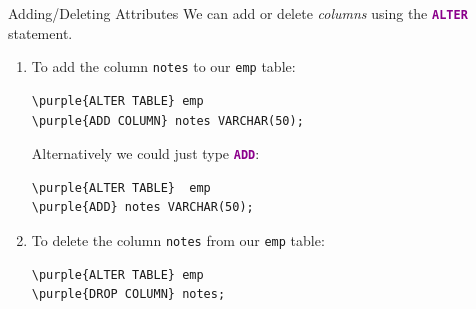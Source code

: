 \documentclass[xcolor=svgnames]{beamer}
\newcommand{\purple}[1]{{\textcolor{DarkMagenta}{#1}}}
\newcommand{\command}[1]{\texttt{\textbf{\textcolor{DarkMagenta}{#1}}}}
\theoremstyle{example}
\begin{document}



\begin{frame}[fragile]{Adding/Deleting Attributes}
We can add or delete \textit{columns}  using the \command{ALTER} statement.  
\vfill
\begin{enumerate}
\item To add the column {\tt notes} to our {\tt emp} table:\\
\begin{Verbatim}[commandchars=\\\{\}, xleftmargin=0.1in, frame=single]
\purple{ALTER TABLE} emp 
\purple{ADD COLUMN} notes VARCHAR(50);
\end{Verbatim}
\vspace{1em}

Alternatively we could just type \command{ADD}:
\begin{Verbatim}[commandchars=\\\{\}, xleftmargin=0.1in, frame=single]
\purple{ALTER TABLE}  emp 
\purple{ADD} notes VARCHAR(50);
\end{Verbatim}
\vfill

\item To delete the column {\tt notes} from our {\tt emp} table:\\
\begin{Verbatim}[commandchars=\\\{\}, xleftmargin=0.1in, frame=single]
\purple{ALTER TABLE} emp
\purple{DROP COLUMN} notes;
\end{Verbatim}
\vfill
\end{enumerate}
\end{frame}
\end{document}
